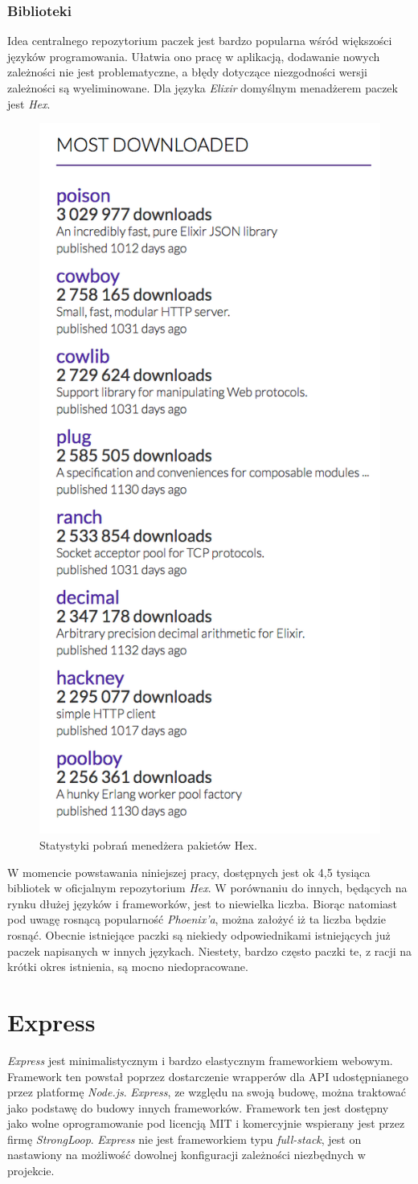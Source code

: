 \documentclass[mgr,oneside]{mgr}
\begin{document}
\subsubsection{Biblioteki}
Idea centralnego repozytorium paczek jest bardzo popularna wśród większości języków programowania. Ułatwia ono pracę w aplikacją, dodawanie nowych zależności nie jest problematyczne, a błędy dotyczące niezgodności wersji zależności są wyeliminowane. Dla języka \textit{Elixir} domyślnym menadżerem paczek jest \textit{Hex}.

\begin{figure}[h]
  \centering
  \includegraphics[width=.4\linewidth]{images/hex_stats}
  \caption{Statystyki pobrań menedżera pakietów Hex.}
  \label{fig:hex_stats}
\end{figure}

W momencie powstawania niniejszej pracy, dostępnych jest ok 4,5 tysiąca bibliotek w oficjalnym repozytorium  \textit{Hex}. W porównaniu do innych, będących na rynku dłużej języków i frameworków, jest to niewielka liczba. Biorąc natomiast pod uwagę rosnącą popularność \textit{Phoenix'a}, można założyć iż ta liczba będzie rosnąć. Obecnie istniejące paczki są niekiedy odpowiednikami istniejących już paczek napisanych w innych językach. Niestety, bardzo często paczki te, z racji na krótki okres istnienia, są mocno niedopracowane.

\section{Express}
\textit{Express} jest minimalistycznym i bardzo elastycznym frameworkiem webowym. Framework ten powstał poprzez dostarczenie wrapperów dla API udostępnianego przez platformę \textit{Node.js}. \textit{Express}, ze względu na swoją budowę, można traktować jako podstawę do budowy innych frameworków. Framework ten jest dostępny jako wolne oprogramowanie pod licencją MIT i komercyjnie wspierany jest przez firmę \textit{StrongLoop}. \textit{Express} nie jest frameworkiem typu \textit{full-stack}, jest on nastawiony na możliwość dowolnej konfiguracji zależności niezbędnych w projekcie.
\end{document}
